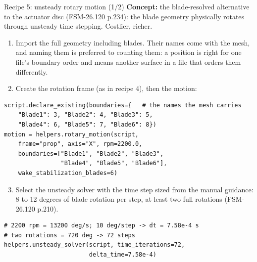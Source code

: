 \documentclass[aspectratio=169,10pt]{beamer}
\begin{document}
\begin{frame}{Recipe 5: unsteady rotary motion (1/2)}
  \textbf{Concept:} the blade-resolved alternative to the actuator disc (FSM-26.120 p.234): the blade geometry physically rotates through unsteady time stepping. Costlier, richer.
  \begin{enumerate}
    \item Import the full geometry including blades. Their names come with the mesh, and naming them is preferred to counting them: a position is right for one file's boundary order and means another surface in a file that orders them differently.
    \item Create the rotation frame (as in recipe 4), then the motion:
  \end{enumerate}
\begin{lstlisting}
script.declare_existing(boundaries={   # the names the mesh carries
    "Blade1": 3, "Blade2": 4, "Blade3": 5,
    "Blade4": 6, "Blade5": 7, "Blade6": 8})
motion = helpers.rotary_motion(script,
    frame="prop", axis="X", rpm=2200.0,
    boundaries=["Blade1", "Blade2", "Blade3",
                "Blade4", "Blade5", "Blade6"],
    wake_stabilization_blades=6)
\end{lstlisting}
  \begin{enumerate}
    \setcounter{enumi}{2}
    \item Select the unsteady solver with the time step sized from the manual guidance: 8 to 12 degrees of blade rotation per step, at least two full rotations (FSM-26.120 p.210).
  \end{enumerate}
\begin{lstlisting}
# 2200 rpm = 13200 deg/s; 10 deg/step -> dt = 7.58e-4 s
# two rotations = 720 deg -> 72 steps
helpers.unsteady_solver(script, time_iterations=72,
                        delta_time=7.58e-4)
\end{lstlisting}
\end{frame}
\end{document}
